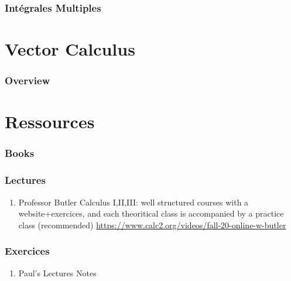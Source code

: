 \documentclass{article}
\begin{document}
\section{Intégrales Multiples}


\part{Vector Calculus}
\section{Overview}
\pagebreak

\part{Ressources} %
\label{prt:Ressources}

\section{Books}%
\label{sec:Books}

\section{Lectures}%
\label{sec:Lectures}

\begin{enumerate}
    \item Professor Butler Calculus I,II,III: well structured courses with a
	website+exercices, and each theoritical class is accompanied by a
	practice class (recommended)
	\url{https://www.calc2.org/videos/fall-20-online-w-butler}
\end{enumerate}

\section{Exercices}%
\label{sec:Exercices}

\begin{enumerate}
    \item Paul's Lectures Notes
\end{enumerate}

\end{document}

